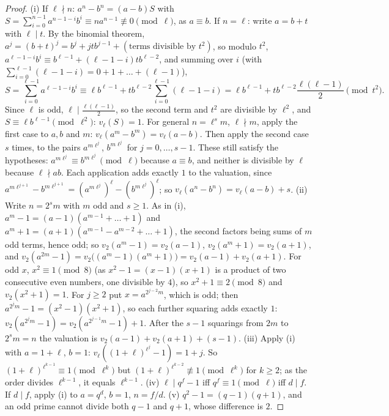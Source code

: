 \begin{proof}
(i) If $\ell\nmid n$: $a^n-b^n=(a-b)S$ with $S=\sum_{i=0}^{n-1}a^{n-1-i}b^i\equiv na^{n-1}\not\equiv0\pmod\ell$, as $a\equiv b$. If $n=\ell$: write $a=b+t$ with $\ell\mid t$.
By the binomial theorem, $a^{j}=(b+t)^{j}=b^{j}+jtb^{j-1}+(\text{terms divisible by }t^2)$, so modulo $t^2$,
$a^{\ell-1-i}b^i\equiv b^{\ell-1}+(\ell-1-i)tb^{\ell-2}$, and summing over $i$ (with $\sum_{i=0}^{\ell-1}(\ell-1-i)=0+1+\dots+(\ell-1)$),
\[
S=\sum_{i=0}^{\ell-1}a^{\ell-1-i}b^i\equiv\ell b^{\ell-1}+tb^{\ell-2}\sum_{i=0}^{\ell-1}(\ell-1-i)=\ell b^{\ell-1}+tb^{\ell-2}\frac{\ell(\ell-1)}2\pmod{t^2}.
\]
Since $\ell$ is odd, $\ell\mid\frac{\ell(\ell-1)}2$, so the second term and $t^2$ are divisible by $\ell^2$, and $S\equiv\ell b^{\ell-1}\pmod{\ell^2}$: $v_\ell(S)=1$. For
general $n=\ell^sm$, $\ell\nmid m$, apply the first case to $a,b$ and $m$: $v_\ell(a^m-b^m)=v_\ell(a-b)$. Then apply the second case $s$ times,
to the pairs $a^{m\ell^j}$, $b^{m\ell^j}$ for $j=0,\dots,s-1$. These still satisfy the hypotheses: $a^{m\ell^j}\equiv b^{m\ell^j}\pmod\ell$ because $a\equiv b$, and
neither is divisible by $\ell$ because $\ell\nmid ab$. Each application adds exactly $1$ to the valuation, since
$a^{m\ell^{j+1}}-b^{m\ell^{j+1}}=(a^{m\ell^j})^\ell-(b^{m\ell^j})^\ell$; so $v_\ell(a^n-b^n)=v_\ell(a-b)+s$.
(ii) Write $n=2^sm$ with $m$ odd and $s\ge1$. As in (i), $a^m-1=(a-1)(a^{m-1}+\dots+1)$ and $a^m+1=(a+1)(a^{m-1}-a^{m-2}+\dots+1)$, the
second factors being sums of $m$ odd terms, hence odd; so $v_2(a^m-1)=v_2(a-1)$, $v_2(a^m+1)=v_2(a+1)$, and
$v_2(a^{2m}-1)=v_2\bigl((a^m-1)(a^m+1)\bigr)=v_2(a-1)+v_2(a+1)$. For odd $x$, $x^2\equiv1\pmod8$ (as $x^2-1=(x-1)(x+1)$ is a product of two consecutive
even numbers, one divisible by $4$), so $x^2+1\equiv2\pmod8$ and $v_2(x^2+1)=1$. For $j\ge2$ put $x=a^{2^{j-2}m}$, which is odd; then
$a^{2^jm}-1=(x^2-1)(x^2+1)$, so each further squaring adds exactly $1$: $v_2(a^{2^jm}-1)=v_2(a^{2^{j-1}m}-1)+1$. After the $s-1$ squarings from
$2m$ to $2^sm=n$ the valuation is $v_2(a-1)+v_2(a+1)+(s-1)$.
(iii) Apply (i) with $a=1+\ell$, $b=1$: $v_\ell((1+\ell)^{\ell^j}-1)=1+j$. So $(1+\ell)^{\ell^{k-1}}\equiv1\pmod{\ell^k}$ but $(1+\ell)^{\ell^{k-2}}\not\equiv1\pmod{\ell^k}$ for
$k\ge2$; as the order divides $\ell^{k-1}$, it equals $\ell^{k-1}$.
(iv) $\ell\mid q^f-1$ iff $q^f\equiv1\pmod\ell$ iff $d\mid f$. If $d\mid f$, apply (i) to $a=q^d$, $b=1$, $n=f/d$.
(v) $q^2-1=(q-1)(q+1)$, and an odd prime cannot divide both $q-1$ and $q+1$, whose difference is $2$.
\end{proof}

